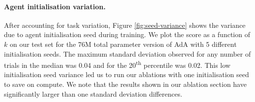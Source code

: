 \paragraph{Agent initialisation variation.} After accounting for task variation, Figure \ref{fig:seed-variance} shows the variance due to agent initialisation seed during training. We plot the score as a function of $k$ on our test set for the 76M total parameter version of AdA with 5 different initialisation seeds. The maximum standard deviation observed for any number of trials in the median was 0.04 and for the 20\textsuperscript{th} percentile was 0.02. This low initialisation seed variance led us to run our ablations with one initialisation seed to save on compute. We note that the results shown in our ablation section have significantly larger than one standard deviation differences. 